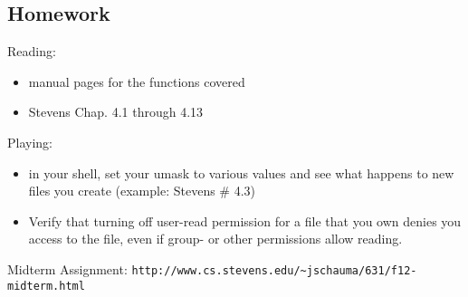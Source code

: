 \documentclass[xga]{xdvislides}
\begin{document}
\subsection{Homework}
Reading:
\begin{itemize}
	\item manual pages for the functions covered
	\item Stevens Chap. 4.1 through 4.13
\end{itemize}
Playing:
\begin{itemize}
	\item in your shell, set your umask to various values and see what
          happens to new files you create (example: Stevens \# 4.3)
	\item Verify that turning off user-read permission for a file that you own
		denies you access to the file, even if group- or other permissions
		allow reading.
\end{itemize}
\addvspace{.5in}
Midterm Assignment:
\verb+http://www.cs.stevens.edu/~jschauma/631/f12-midterm.html+
\end{document}
